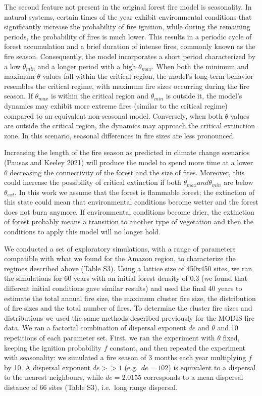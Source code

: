 \documentclass[
]{article}
\begin{document}
The second feature not present in the original forest fire model is
seasonality. In natural systems, certain times of the year exhibit
environmental conditions that significantly increase the probability of
fire ignition, while during the remaining periods, the probability of
fires is much lower. This results in a periodic cycle of forest
accumulation and a brief duration of intense fires, commonly known as
the fire season. Consequently, the model incorporates a short period
characterized by a low \(\theta_{min}\) and a longer period with a high
\(\theta_{max}\). When both the minimum and maximum \(\theta\) values
fall within the critical region, the model's long-term behavior
resembles the critical regime, with maximum fire sizes occurring during
the fire season. If \(\theta_{max}\) is within the critical region and
\(\theta_{min}\) is outside it, the model's dynamics may exhibit more
extreme fires (similar to the critical regime) compared to an equivalent
non-seasonal model. Conversely, when both \(\theta\) values are outside
the critical region, the dynamics may approach the critical extinction
zone. In this scenario, seasonal differences in fire sizes are less
pronounced.

Increasing the length of the fire season as predicted in climate change
scenarios (Pausas and Keeley 2021) will produce the model to spend more
time at a lower \(\theta\) decreasing the connectivity of the forest and
the size of fires. Moreover, this could increase the possibility of
critical extinction if both \(\theta_{max} and \theta_{min}\) are below
\(\theta_{ext}\). In this work we assume that the forest is flammable
forest; the extinction of this state could mean that environmental
conditions become wetter and the forest does not burn anymore. If
environmental conditions become drier, the extinction of forest probably
means a transition to another type of vegetation and then the conditions
to apply this model will no longer hold.

We conducted a set of exploratory simulations, with a range of
parameters compatible with what we found for the Amazon region, to
characterize the regimes described above (Table S3). Using a lattice
size of 450x450 sites, we ran the simulations for 60 years with an
initial forest density of 0.3 (we found that different initial
conditions gave similar results) and used the final 40 years to estimate
the total annual fire size, the maximum cluster fire size, the
distribution of fire sizes and the total number of fires. To determine
the cluster fire sizes and distributions we used the same methods
described previously for the MODIS fire data. We ran a factorial
combination of dispersal exponent \(de\) and \(\theta\) and 10
repetitions of each parameter set. First, we ran the experiment with
\(\theta\) fixed, keeping the ignition probability \(f\) constant, and
then repeated the experiment with seasonality: we simulated a fire
season of 3 months each year multiplying \(f\) by 10. A dispersal
exponent \(de>>1\) (e.g.~\(de=102\)) is equivalent to a dispersal to the
nearest neighbours, while \(de=2.0155\) corresponds to a mean dispersal
distance of 66 sites (Table S3), i.e.~long range dispersal.
\end{document}

